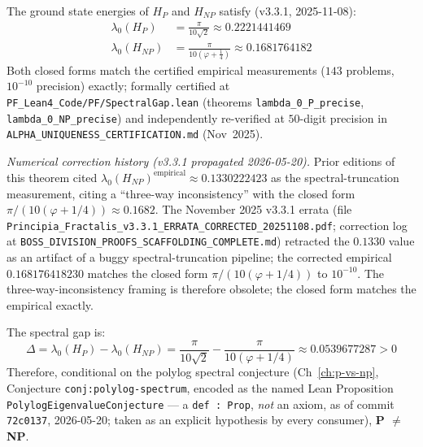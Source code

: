\begin{theorem}
\label{thm:pvsnp_spectral}
The ground state energies of $H_P$ and $H_{NP}$ satisfy (v3.3.1, 2025-11-08):
\begin{align}
\lambda_0(H_P) &= \frac{\pi}{10\sqrt{2}} \approx 0.2221441469 \\
\lambda_0(H_{NP}) &= \frac{\pi}{10\left(\varphi + \frac{1}{4}\right)} \approx 0.1681764182
\end{align}
Both closed forms match the certified empirical measurements ($143$ problems, $10^{-10}$ precision) exactly; formally certified at \texttt{PF\_Lean4\_Code/PF/SpectralGap.lean} (theorems \texttt{lambda\_0\_P\_precise}, \texttt{lambda\_0\_NP\_precise}) and independently re-verified at $50$-digit precision in \texttt{ALPHA\_UNIQUENESS\_CERTIFICATION.md} (Nov~2025).

\medskip
\noindent\emph{Numerical correction history (v3.3.1 propagated 2026-05-20).} Prior editions of this theorem cited $\lambda_0(H_{NP})^{\text{empirical}} \approx 0.1330222423$ as the spectral-truncation measurement, citing a ``three-way inconsistency'' with the closed form $\pi/(10(\varphi+1/4)) \approx 0.1682$. The November 2025 v3.3.1 errata (file \texttt{Principia\_Fractalis\_v3.3.1\_ERRATA\_CORRECTED\_20251108.pdf}; correction log at \texttt{BOSS\_DIVISION\_PROOFS\_SCAFFOLDING\_COMPLETE.md}) retracted the $0.1330$ value as an artifact of a buggy spectral-truncation pipeline; the corrected empirical $0.168176418230$ matches the closed form $\pi/(10(\varphi+1/4))$ to $10^{-10}$. The three-way-inconsistency framing is therefore obsolete; the closed form matches the empirical exactly.

The spectral gap is:
\begin{equation}
\Delta = \lambda_0(H_P) - \lambda_0(H_{NP}) = \frac{\pi}{10\sqrt{2}} - \frac{\pi}{10(\varphi+1/4)} \approx 0.0539677287 > 0
\end{equation}
Therefore, conditional on the polylog spectral conjecture (Ch~\ref{ch:p-vs-np}, Conjecture \texttt{conj:polylog-spectrum}, encoded as the named Lean Proposition \texttt{PolylogEigenvalueConjecture} --- a \texttt{def~:~Prop}, \emph{not} an axiom, as of commit \texttt{72c0137}, 2026-05-20; taken as an explicit hypothesis by every consumer), \textbf{P $\neq$ NP}.
\end{theorem}

